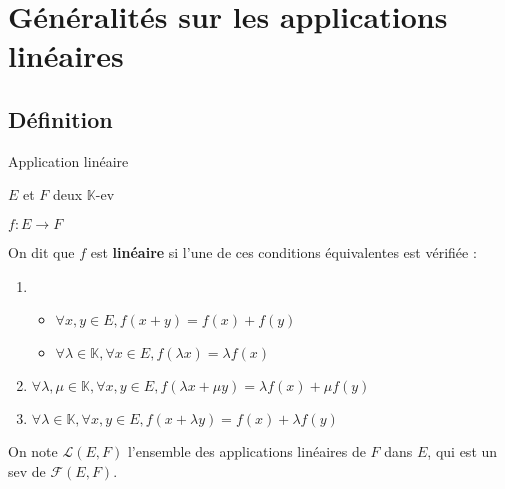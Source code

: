 
\section[Généralités]{Généralités sur les applications linéaires}

\subsection{Définition}

    \begin{defi}{Application linéaire}{}
        \begin{soient}
            \begin{multicols}{2}
                \item $E$ et $F$ deux $\mathbb{K}$-ev 
                \item $f : E \to F$
            \end{multicols}
        \end{soient}
        On dit que $f$ est \textbf{linéaire} si l’une de ces conditions équivalentes est vérifiée :
        \begin{enumerate}[label=\textcolor{myyellow}{\textit{(\alph*)}}]
            \item \begin{itemize}
                \item $\forall x,y \in E, f(x+y) = f(x) + f(y)$
                \item $\forall \lambda \in \mathbb{K}, \forall x \in E, f(\lambda x) = \lambda f(x)$
            \end{itemize}
            \item $\forall \lambda,\mu \in \mathbb{K}, \forall x,y \in E, f(\lambda x + \mu y)= \lambda f(x) + \mu f(y)$
            \item $\forall \lambda \in \mathbb{K}, \forall x,y \in E, f( x + \lambda y)= f(x) + \lambda f(y)$
        \end{enumerate}
        On note $\mathcal{L}(E,F)$ l’ensemble des applications linéaires de $F$ dans $E$, qui est un sev de $\mathcal{F}(E,F)$.


\end{defi}
